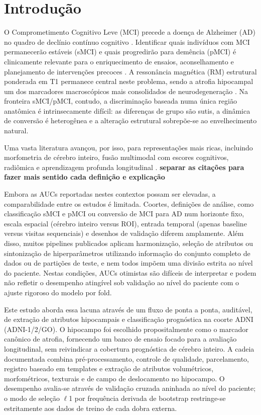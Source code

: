 \documentclass[review]{elsarticle}
\newcommand{\sugestao}[2]{%
	\textcolor{red}{\sout{\textbf{#1}}}%
	\textcolor{blue!100!black}{\textbf{#2}}%
}
\begin{document}
	
\section{Introdução}\label{sec:Introduction}

	O Comprometimento Cognitivo Leve (MCI) precede a doença de Alzheimer (AD) no quadro de declínio contínuo cognitivo \cite{petersen-1999}. Identificar quais indivíduos com MCI permanecerão estáveis (sMCI) e quais progredirão para demência (pMCI) é clinicamente relevante para o enriquecimento de ensaios, aconselhamento e planejamento de intervenções precoces \cite{petersen-2009}. A ressonância magnética (RM) estrutural ponderada em T1 permanece central neste problema, sendo a atrofia hipocampal um dos marcadores macroscópicos mais consolidados de neurodegeneração \cite{scheltens-1992}. Na fronteira sMCI/pMCI, contudo, a discriminação baseada numa única região anatômica é intrinsecamente difícil: as diferenças de grupo são sutis, a dinâmica de conversão é heterogênea e a alteração estrutural sobrepõe-se ao envelhecimento natural.
	
	Uma vasta literatura avançou, por isso, para representações mais ricas, incluindo morfometria de cérebro inteiro, fusão multimodal com escores cognitivos, radiômica e aprendizagem profunda longitudinal \cite{moradi-2015,ye-2012,zhang-2019,lin-2020,aghajanian-2025}. 
	\sugestao{}{separar as citações para fazer mais sentido cada definição e explicação}
	Embora as AUCs reportadas nestes contextos possam ser elevadas, a comparabilidade entre os estudos é limitada. Coortes, definições de análise, como classificação sMCI e pMCI ou conversão de MCI para AD num horizonte fixo, escala espacial (cérebro inteiro versus ROI), entrada temporal (apenas baseline versus visitas sequenciais) e desenhos de validação diferem amplamente. Além disso, muitos pipelines publicados aplicam harmonização, seleção de atributos ou sintonização de hiperparâmetros utilizando informação do conjunto completo de dados ou de partições de teste, e nem todos impõem uma divisão estrita ao nível do paciente. Nestas condições, AUCs otimistas são difíceis de interpretar e podem não refletir o desempenho atingível sob validação ao nível do paciente com o ajuste rigoroso do modelo por fold.
	
	Este estudo aborda essa lacuna através de um fluxo de ponta a ponta, auditável, de extração de atributos hipocampais e classificação prognóstica na coorte ADNI (ADNI-1/2/GO). O hipocampo foi escolhido propositalmente como o marcador canônico de atrofia, fornecendo um banco de ensaio focado para a avaliação longitudinal, sem reivindicar a cobertura prognóstica de cérebro inteiro. A cadeia documentada combina pré-processamento, controle de qualidade, parcelamento, registro baseado em templates e extração de atributos volumétricos, morfométricos, texturais e de campo de deslocamento no hipocampo. O desempenho avalia-se através de validação cruzada aninhada ao nível do paciente; o modo de seleção $\ell$1 por frequência derivada de bootstrap restringe-se estritamente aos dados de treino de cada dobra externa.
	
\end{document}

